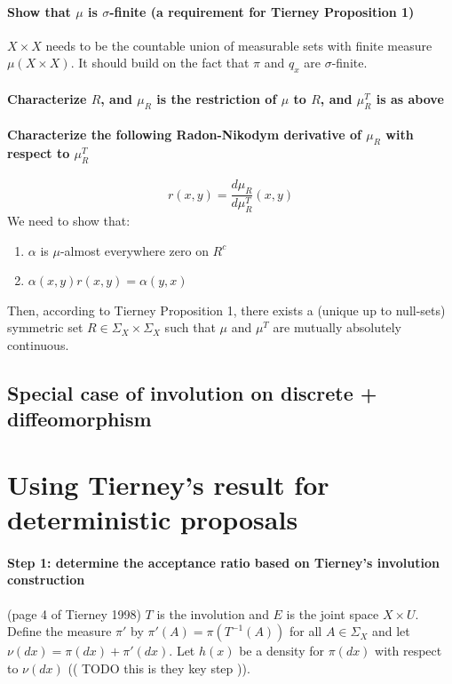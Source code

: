 \documentclass[twoside]{article}
\begin{document}
\paragraph{Show that $\mu$ is $\sigma$-finite (a requirement for Tierney Proposition 1)}
$X \times X$ needs to be the countable union of measurable sets with finite measure $\mu(X \times X)$.
It should build on the fact that $\pi$ and $q_x$ are $\sigma$-finite.

\paragraph{Characterize $R$, and $\mu_R$ is the restriction of $\mu$ to $R$, and $\mu_R^T$ is as above}


\paragraph{Characterize the following Radon-Nikodym derivative of $\mu_R$ with respect to $\mu_R^T$}
\[
r(x, y) = \frac{d\mu_R}{d\mu_R^T}(x, y)
\]
We need to show that:
\begin{enumerate}
\item $\alpha$ is $\mu$-almost everywhere zero on $R^c$
\item $\alpha(x, y) r(x, y) = \alpha(y, x)$
\end{enumerate}
Then, according to Tierney Proposition 1, there exists a (unique up to null-sets) symmetric set $R \in \Sigma_X \times \Sigma_X$ such that $\mu$ and $\mu^T$ are mutually absolutely continuous.

\subsection{Special case of involution on discrete + diffeomorphism}

\section{Using Tierney's result for deterministic proposals}

\paragraph{Step 1: determine the acceptance ratio based on Tierney's involution construction}
(page 4 of Tierney 1998)
$T$ is the involution and $E$ is the joint space $X \times U$.
Define the measure $\pi'$ by $\pi'(A) = \pi(T^{-1}(A))$ for all $A \in \Sigma_X$
and let $\nu(dx) = \pi(dx) + \pi'(dx)$.
Let $h(x)$ be a density for $\pi(dx)$ with respect to $\nu(dx)$ (( TODO this is they key step )).
\end{document}
